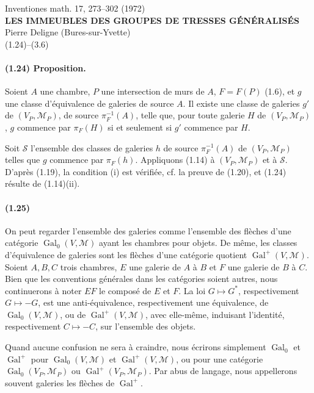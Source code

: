 \documentclass[10pt]{article}
\begin{document}
\begin{center}
{\large Inventiones math. 17, 273--302 (1972)}\\[0.4em]
{\Large\bfseries LES IMMEUBLES DES GROUPES DE TRESSES GÉNÉRALISÉS}\\[0.4em]
Pierre Deligne (Bures-sur-Yvette)\\[0.5em]
{\normalsize (1.24)--(3.6)}
\end{center}


\paragraph{(1.24) Proposition.} Soient \(A\) une chambre, \(P\) une intersection de murs de \(A\), \(F=F(P)\) (1.6), et \(g\) une classe d'équivalence de galeries de source \(A\). Il existe une classe de galeries \(g'\) de \((V_P,\mathcal M_P)\), de source \(\pi_F^{-1}(A)\), telle que, pour toute galerie \(H\) de \((V_P,\mathcal M_P)\), \(g\) commence par \(\pi_F(H)\) si et seulement si \(g'\) commence par \(H\).

Soit \(\mathcal S\) l'ensemble des classes de galeries \(h\) de source \(\pi_F^{-1}(A)\) de \((V_P,\mathcal M_P)\) telles que \(g\) commence par \(\pi_F(h)\). Appliquons (1.14) à \((V_P,\mathcal M_P)\) et à \(\mathcal S\). D'après (1.19), la condition (i) est vérifiée, cf. la preuve de (1.20), et (1.24) résulte de (1.14)(ii).

\paragraph{(1.25)} On peut regarder l'ensemble des galeries comme l'ensemble des flèches d'une catégorie \(\operatorname{Gal}_0(V,\mathcal M)\) ayant les chambres pour objets. De même, les classes d'équivalence de galeries sont les flèches d'une catégorie quotient \(\operatorname{Gal}^+(V,\mathcal M)\). Soient \(A,B,C\) trois chambres, \(E\) une galerie de \(A\) à \(B\) et \(F\) une galerie de \(B\) à \(C\). Bien que les conventions générales dans les catégories soient autres, nous continuerons à noter \(EF\) le composé de \(E\) et \(F\). La loi \(G\mapsto G^*\), respectivement \(G\mapsto -G\), est une anti-équivalence, respectivement une équivalence, de \(\operatorname{Gal}_0(V,\mathcal M)\), ou de \(\operatorname{Gal}^+(V,\mathcal M)\), avec elle-même, induisant l'identité, respectivement \(C\mapsto -C\), sur l'ensemble des objets.

Quand aucune confusion ne sera à craindre, nous écrirons simplement \(\operatorname{Gal}_0\) et \(\operatorname{Gal}^+\) pour \(\operatorname{Gal}_0(V,\mathcal M)\) et \(\operatorname{Gal}^+(V,\mathcal M)\), ou pour une catégorie \(\operatorname{Gal}_0(V_P,\mathcal M_P)\) ou \(\operatorname{Gal}^+(V_P,\mathcal M_P)\). Par abus de langage, nous appellerons souvent galeries les flèches de \(\operatorname{Gal}^+\).
\end{document}
